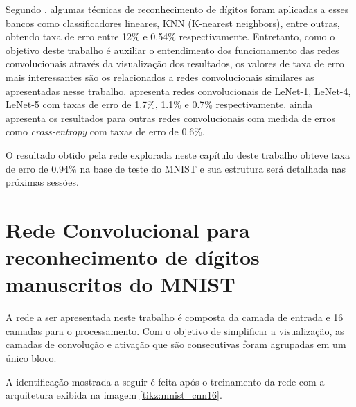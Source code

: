 \documentclass[
	12pt,				%
	oneside,			%
	a4paper,			%
	english,			%
	french,				%
	spanish,			%
	brazil,				%
	]{abntex2}
\begin{document}
\par Segundo , algumas técnicas de reconhecimento de dígitos foram aplicadas a esses bancos como classificadores lineares, KNN (K-nearest neighbors), entre outras, obtendo taxa de erro entre 12\% e 0.54\% respectivamente. Entretanto, como o objetivo deste trabalho é auxiliar o entendimento dos funcionamento das redes convolucionais através da visualização dos resultados, os valores de taxa de erro mais interessantes são os relacionados a redes convolucionais similares as apresentadas nesse trabalho.  apresenta redes convolucionais de LeNet-1, LeNet-4, LeNet-5 com taxas de erro de 1.7\%, 1.1\% e 0.7\% respectivamente.  ainda apresenta os resultados para outras redes convolucionais com medida de erros como \textit{cross-entropy} com taxas de erro de 0.6\%,

\par O resultado obtido pela rede explorada neste capítulo deste trabalho obteve taxa de erro de 0.94\% na base de teste do MNIST e sua estrutura será detalhada nas próximas sessões.

\section{Rede Convolucional para reconhecimento de dígitos manuscritos do MNIST}
\par A rede a ser apresentada neste trabalho é composta da camada de entrada e 16 camadas para o processamento. Com o objetivo de simplificar a visualização, as camadas de convolução e ativação que são consecutivas foram agrupadas em um único bloco.
\par A identificação mostrada a seguir é feita após o treinamento da rede com a arquitetura exibida na imagem \ref{tikz:mnist_cnn16}.
\end{document}
